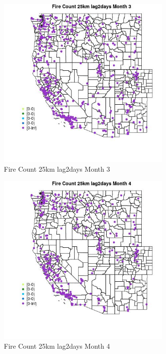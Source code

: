 \begin{figure} 
\centering  
\includegraphics[width=0.77\textwidth]{Code_Outputs/Report_ML_input_PM25_Step4_part_e_de_duplicated_aves_compiled_2019-05-18wNAs_MapObsMo3Fire_Count_25km_lag2days.jpg} 
\caption{\label{fig:Report_ML_input_PM25_Step4_part_e_de_duplicated_aves_compiled_2019-05-18wNAsMapObsMo3Fire_Count_25km_lag2days}Fire Count 25km lag2days Month 3} 
\end{figure} 
 

\begin{figure} 
\centering  
\includegraphics[width=0.77\textwidth]{Code_Outputs/Report_ML_input_PM25_Step4_part_e_de_duplicated_aves_compiled_2019-05-18wNAs_MapObsMo4Fire_Count_25km_lag2days.jpg} 
\caption{\label{fig:Report_ML_input_PM25_Step4_part_e_de_duplicated_aves_compiled_2019-05-18wNAsMapObsMo4Fire_Count_25km_lag2days}Fire Count 25km lag2days Month 4} 
\end{figure} 
 

